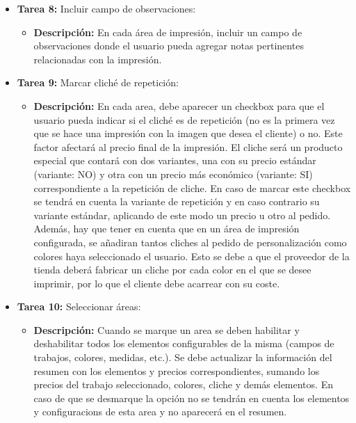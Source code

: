 \documentclass[11pt]{article}
\begin{document}
\begin{itemize}
\begin{itemize}[label=--]
          \end{itemize}
    \item \textbf{Tarea 8:} Incluir campo de observaciones:
          \begin{itemize}[label=--]
              \item \textbf{Descripción:} En cada área de impresión, incluir un campo de observaciones donde el usuario pueda agregar notas pertinentes relacionadas con la impresión.
          \end{itemize}
    
    \item \textbf{Tarea 9:} Marcar cliché de repetición:
          \begin{itemize}[label=--]
              \item \textbf{Descripción:} En cada area, debe aparecer un checkbox para que el usuario pueda indicar si el cliché es de repetición (no es la primera vez que se hace una impresión con la imagen que desea el cliente) o no. Este factor afectará al precio final de la impresión. El cliche será un producto especial que contará con dos variantes, una con su precio estándar (variante: NO) y otra con un precio más económico (variante: SI) correspondiente a la repetición de cliche. En caso de marcar este checkbox se tendrá en cuenta la variante de repetición y en caso contrario su variante estándar, aplicando de este modo un precio u otro al pedido. Además, hay que tener en cuenta que en un área de impresión configurada, se añadiran tantos cliches al pedido de personalización como colores haya seleccionado el usuario. Esto se debe a que el proveedor de la tienda deberá fabricar un cliche por cada color en el que se desee imprimir, por lo que el cliente debe acarrear con su coste.
          \end{itemize}
    \item \textbf{Tarea 10:} Seleccionar áreas:
          \begin{itemize}[label=--]
              \item \textbf{Descripción:} Cuando se marque un area se deben habilitar y deshabilitar todos los elementos configurables de la misma (campos de trabajos, colores, medidas, etc.). Se debe actualizar la información del resumen con los elementos y precios correspondientes, sumando los precios del trabajo seleccionado, colores, cliche y demás elementos. En caso de que se desmarque la opción no se tendrán en cuenta los elementos y configuracions de esta area y no aparecerá en el resumen.
          \end{itemize}

\end{itemize}
\end{document}
